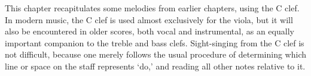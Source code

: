 \documentclass{sight}
\begin{document}
\pagebreak[3]\par
\vspace{5mm}\begin{samepage}This chapter recapitulates some melodies from earlier chapters, using the C clef. In modern music, the C clef is used almost exclusively for the viola, but it will also be encountered in older scores, both vocal and instrumental, as an equally important companion to the treble and bass clefs. Sight-singing from the C clef is not difficult, because one merely follows the usual procedure of determining which line or space on the staff represents `do,' and reading all other notes relative to it.\\


\pagebreak[3]\par
{}%
\label{tune:412}%
{%
\parindent 0pt
\noindent
\ifx\preLilyPondExample \undefined
\else
  \expandafter\preLilyPondExample
\fi
\def\lilypondbook{}%

\ifx\postLilyPondExample \undefined
\else
  \expandafter\postLilyPondExample
\fi
}
\end{samepage}


\pagebreak[3]\par
\vspace{5mm}\begin{samepage}
%
\label{tune:413}%
{%
\parindent 0pt
\noindent
\ifx\preLilyPondExample \undefined
\else
  \expandafter\preLilyPondExample
\fi
\def\lilypondbook{}%

\ifx\postLilyPondExample \undefined
\else
  \expandafter\postLilyPondExample
\fi
}
\end{samepage}
\end{document}
